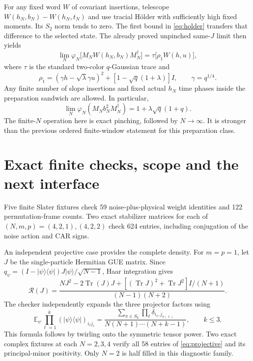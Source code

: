 \documentclass[11pt]{article}
\newcommand{\E}{\mathbb E}
\newcommand{\Tr}{\operatorname{Tr}}
\begin{document}
For any fixed word $W$ of covariant insertions, telescope
$W(h_N,b_N)-W(h_N,t_N)$ and use tracial H\"older with sufficiently
high fixed moments. Its $S_2$ norm tends to zero. The first bound in
\eqref{eq:holder} transfers that difference to the selected state.
The already proved unpinched same-$J$ limit then yields
\begin{equation}\label{eq:limit}
 \lim_N\varphi_N\bigl[M_N W(h_N,b_N)M_N^\dagger\bigr]
   =\tau\bigl[\rho_1 W(h,u)\bigr],
\end{equation}
where $\tau$ is the standard two-color $q$-Gaussian trace and
\begin{equation}
 \rho_1=(\gamma h-\sqrt\lambda\gamma u)^2
          +[1-\sqrt q(1+\lambda)]I,\qquad \gamma=q^{1/4}.
\end{equation}
Any finite number of slope insertions and fixed actual $h_N$ time
phases inside the preparation sandwich are allowed. In particular,
\begin{equation}
 \lim_N\varphi_N(M_N b_N^2 M_N^\dagger)
      =1+\lambda\sqrt q(1+q).
\end{equation}
The finite-$N$ operation here is exact pinching, followed by $N\to
\infty$. It is stronger than the previous ordered finite-window
statement for this preparation class.

\newpage
\section{Exact finite checks, scope and the next interface}
Five finite Slater fixtures check 59 noise-plus-physical weight
identities and 122 permutation-frame counts. Two exact stabilizer
matrices for each of $(N,m,p)=(4,2,1),(4,2,2)$ check 624 entries,
including conjugation of the noise action and CAR signs.

An independent projective case provides the complete density. For
$m=p=1$, let $J$ be the single-particle Hermitian GUE matrix. Since
$q_\psi=(I-|\psi\rangle\langle\psi|)J|\psi\rangle/\sqrt{N-1}$,
Haar integration gives
\begin{equation}\label{eq:projective}
 \mathcal R(J)=\frac{NJ^2-2\Tr(J)J+
       [(\Tr J)^2+\Tr J^2]I/(N+1)}{(N-1)(N+2)}.
\end{equation}
The checker independently expands the three projector factors using
\begin{equation}
 \E_\psi\prod_{\ell=1}^k (|\psi\rangle\langle\psi|)_{i_\ell j_\ell}
 =\frac{\sum_{\pi\in S_k}\prod_\ell\delta_{i_\ell,j_{\pi(\ell)}}}
             {N(N+1)\cdots(N+k-1)},\qquad k\le3.
\end{equation}
This formula follows by twirling onto the symmetric tensor power.
Two exact complex fixtures at each $N=2,3,4$ verify all 58 entries
of \eqref{eq:projective} and its principal-minor positivity.
Only $N=2$ is half filled in this diagnostic family.
\end{document}
